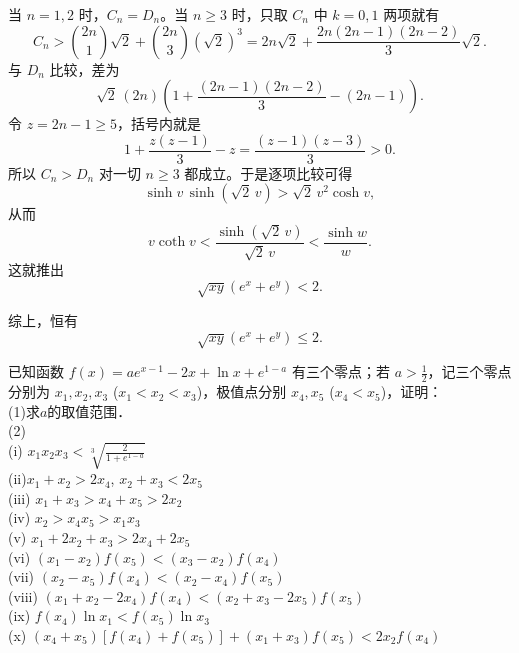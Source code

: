 \begin{solution}
当 $n=1,2$ 时，$C_n=D_n$。当 $n\ge3$ 时，只取 $C_n$ 中 $k=0,1$ 两项就有
$$ C_n>\binom{2n}{1}\sqrt2+\binom{2n}{3}(\sqrt2)^3
=2n\sqrt2+\frac{2n(2n-1)(2n-2)}{3}\sqrt2. $$
与 $D_n$ 比较，差为
$$ \sqrt2\,(2n)\left(1+\frac{(2n-1)(2n-2)}{3}-(2n-1)\right). $$
令 $z=2n-1\ge5$，括号内就是
$$ 1+\frac{z(z-1)}{3}-z=\frac{(z-1)(z-3)}{3}>0. $$
所以 $C_n>D_n$ 对一切 $n\ge3$ 都成立。于是逐项比较可得
$$ \sinh v\,\sinh(\sqrt2\,v)>\sqrt2\,v^2\cosh v, $$
从而
$$ v\coth v<\frac{\sinh(\sqrt2\,v)}{\sqrt2\,v}<\frac{\sinh w}{w}. $$
这就推出
$$ \sqrt{xy}(e^x+e^y)<2. $$

综上，恒有
$$ \sqrt{xy}(e^x+e^y)\le2. $$
\end{solution}


\begin{example}[零点与极值题]
已知函数 $f(x) = ae^{x-1} - 2x + \ln x + e^{1-a}$ 有三个零点；若 $a > \frac{1}{2}$，记三个零点分别为 $x_1, x_2, x_3$ ($x_1 < x_2 < x_3$)，极值点分别 $x_4, x_5$ ($x_4 < x_5$)，证明：\\
(1)求$a$的取值范围．\\
(2)\\
(i) $x_1 x_2 x_3 < \sqrt[3]{\frac{2}{1 + e^{1-a}}}$\\
(ii)$x_1 + x_2 > 2x_4$, $x_2 + x_3 < 2x_5$\\
(iii) $x_1 + x_3 > x_4 + x_5 > 2x_2$\\
(iv) $x_2 > x_4 x_5 > x_1 x_3$\\
(v) $x_1 + 2x_2 + x_3 > 2x_4 + 2x_5$\\
(vi) $(x_1 - x_2)f(x_5) < (x_3 - x_2)f(x_4)$\\
(vii) $(x_2 - x_5)f(x_4) < (x_2 - x_4)f(x_5)$\\
(viii) $(x_1 + x_2 - 2x_4)f(x_4) < (x_2 + x_3 - 2x_5)f(x_5)$\\
(ix) $f(x_4)\ln x_1 < f(x_5)\ln x_3$\\
(x) $(x_4 + x_5)[f(x_4) + f(x_5)] + (x_1 + x_3)f(x_5) < 2x_2 f(x_4)$
\end{example}

